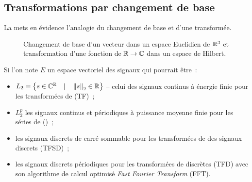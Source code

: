 
\subsection{Transformations par changement de base}
La  mets en évidence l'analogie du changement de
base et d'une transformée.

\begin{figure}[ht]
  \centering {}
  \caption{Changement de base d'un vecteur dans un espace Euclidien de
    $\mathbb{R}^3$ et transformation d'une fonction de $\mathbb{R}\rightarrow\mathbb{C}$ dans
    un espace de Hilbert.}
  \label{fig:espaces}
\end{figure}

Si l'on note $E$ un espace vectoriel des signaux qui pourrait être~:

\begin{itemize}
\item
  $L_2 = \left\{s \in \mathbb{C}^{\mathbb{R}} \quad|\quad \left\|s\right\|_2 \in \mathbb{R}\right\}$ --
  celui des signaux continus à énergie finie pour les transformées de
  \Fourier{} (TF)~;
\item $L_2^p$ les signaux continus et périodiques à puissance moyenne
  finie pour les séries de \Fourier{} (\sdf)~;
\item les signaux discrets de carré sommable pour les transformées de
  \Fourier{} des signaux discrets (TFSD)~;
\item les signaux discrets périodiques pour les transformées de
  \Fourier{} discrètes (TFD) avec son algorithme de calcul optimisé
  \emph{Fast Fourier Transform} (FFT).
\end{itemize}

